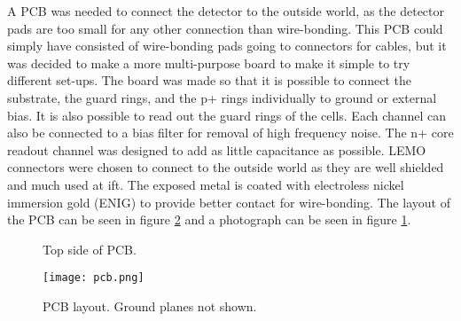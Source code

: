\documentclass[../main/thesis.tex]{subfiles}
\begin{document}
A \gls{PCB} was needed to connect the detector to the outside world, as the detector pads are too small for any other connection than wire-bonding. This \gls{PCB} could simply have consisted of wire-bonding pads going to connectors for cables, but it was decided to make a more multi-purpose board to make it simple to try different set-ups. The board was made so that it is possible to connect the substrate, the guard rings, and the p+ rings individually to ground or external bias. It is also possible to read out the guard rings of the cells. Each channel can also be connected to a bias filter for removal of high frequency noise. The n+ core readout channel was designed to add as little capacitance as possible. LEMO connectors were chosen to connect to the outside world as they are well shielded and much used at \gls{ift}. The exposed metal is coated with electroless nickel immersion gold (ENIG) to provide better contact for wire-bonding. The layout of the \gls{PCB} can be seen in figure \ref{fig-pcb} and a photograph can be seen in figure \ref{fig-pcb-pic}. 

\begin{figure}%
	\centering
	\caption{Top side of PCB.}
	\label{fig-pcb-pic} 
\end{figure}

\begin{figure}%
	\centering
	\texttt{[image: pcb.png]}
	\caption{PCB layout. Ground planes not shown.}
	\label{fig-pcb} 
\end{figure}
\end{document}
